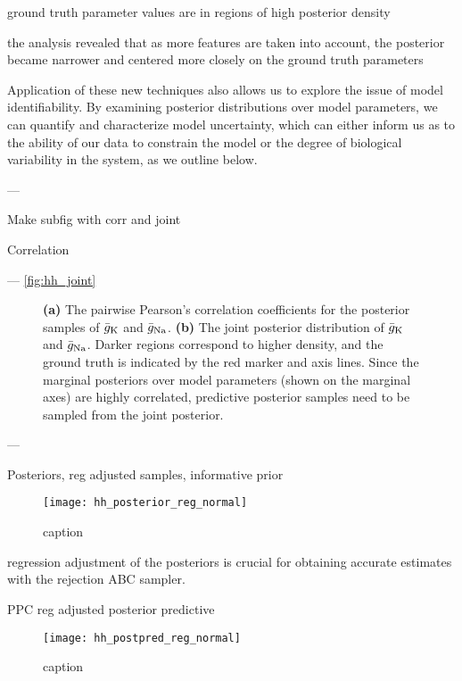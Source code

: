 ground truth parameter values are in regions of high posterior density 


the analysis revealed that as more features are taken into account, the posterior became narrower and centered more closely on the ground truth parameters



Application of these new techniques also allows us to explore the issue of model identifiability. By examining posterior distributions over model parameters, we can quantify and characterize model uncertainty, which can either inform us as to the ability of our data to constrain the model or the degree of biological variability in the system, as we outline below.

---

Make subfig with corr and joint

Correlation 




---
\autoref{fig:hh_joint}
\begin{figure}[!htb]
\centering
{}
\qquad
{}
\caption{\textbf{(a)} The pairwise Pearson's correlation coefficients for the posterior samples of $\bar{g}_{\mathrm{K}}$ and $\bar{g}_{\mathrm{Na}}$. \textbf{(b)} The joint posterior distribution of $\bar{g}_{\mathrm{K}}$ and $\bar{g}_{\mathrm{Na}}$. Darker regions correspond to higher density, and the ground truth is indicated by the red marker and axis lines. Since the marginal posteriors over model parameters (shown on the marginal axes) are highly correlated, predictive posterior samples need to be sampled from the joint posterior. 
}
\label{fig:hh_joint}
\end{figure}

---


Posteriors, reg adjusted samples, informative prior

\begin{figure}[H]
    \centering
    \texttt{[image: hh\_posterior\_reg\_normal]}
    \caption{caption}
    \label{fig:fig1}
\end{figure}

regression adjustment of the posteriors is crucial for obtaining accurate estimates with the rejection ABC sampler. 

PPC reg adjusted posterior predictive 

\begin{figure}[H]
    \centering
    \texttt{[image: hh\_postpred\_reg\_normal]}
    \caption{caption}
    \label{fig:fig1}
\end{figure}


